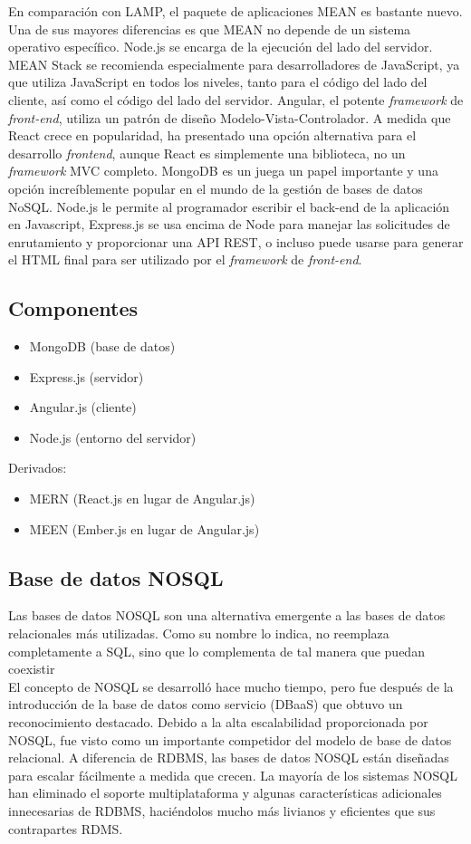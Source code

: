 En comparación con LAMP, el paquete de aplicaciones MEAN es bastante nuevo. Una de sus mayores diferencias es que MEAN no depende de un sistema operativo específico. Node.js se encarga de la ejecución del lado del servidor. MEAN Stack se recomienda especialmente para desarrolladores de JavaScript, ya que utiliza JavaScript en todos los niveles, tanto para el código del lado del cliente, así como el código del lado del servidor. Angular, el potente \textit{framework} de \textit{front-end}, utiliza un patrón de diseño Modelo-Vista-Controlador. A medida que React crece en popularidad, ha presentado una opción alternativa para el desarrollo \textit{frontend}, aunque React es simplemente una biblioteca, no un \textit{framework} MVC completo. MongoDB es un juega un papel importante y una opción increíblemente popular en el mundo de la gestión de bases de datos NoSQL. Node.js le permite al programador escribir el back-end de la aplicación en Javascript, Express.js se usa encima de Node para manejar las solicitudes de enrutamiento y proporcionar una API REST, o incluso puede usarse para generar el HTML final para ser utilizado por el \textit{framework} de \textit{front-end}.
\subsection{Componentes}
\begin{itemize}
  \item MongoDB (base de datos)
  \item Express.js (servidor)
  \item Angular.js (cliente)
  \item Node.js (entorno del servidor)
\end{itemize}

Derivados:

\begin{itemize}
  \item MERN (React.js en lugar de Angular.js)
  \item MEEN (Ember.js en lugar de Angular.js)
\end{itemize}
\subsection{Base de datos NOSQL}
Las bases de datos NOSQL son una alternativa emergente a las bases de datos relacionales más utilizadas. Como su nombre lo indica, no reemplaza completamente a SQL, sino que lo complementa de tal manera que puedan coexistir \\[0.8cm]
El concepto de NOSQL se desarrolló hace mucho tiempo, pero fue después de la introducción de la base de datos como servicio (DBaaS) que obtuvo un reconocimiento destacado. Debido a la alta escalabilidad proporcionada por NOSQL, fue visto como un importante competidor del modelo de base de datos relacional. A diferencia de RDBMS, las bases de datos NOSQL están diseñadas para escalar fácilmente a medida que crecen. La mayoría de los sistemas NOSQL han eliminado el soporte multiplataforma y algunas características adicionales innecesarias de RDBMS, haciéndolos mucho más livianos y eficientes que sus contrapartes RDMS.
